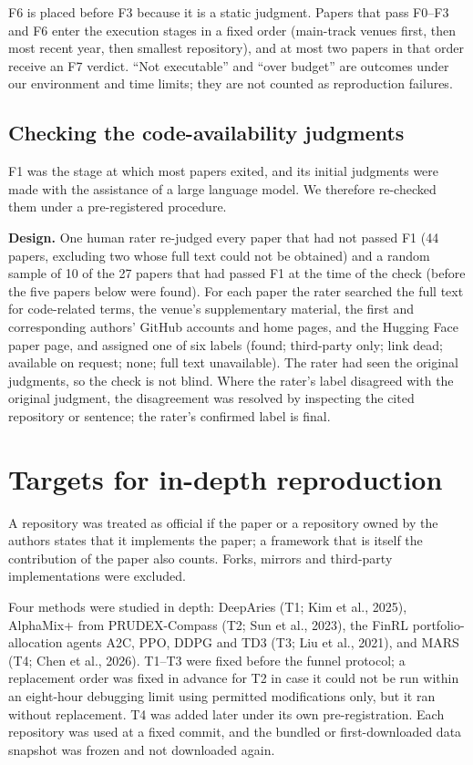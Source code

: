 \documentclass[12pt,a4paper]{report}
\newcounter{none} %
\begin{document}
F6 is placed before F3 because it is a static judgment. Papers that pass
F0--F3 and F6 enter the execution stages in a fixed order (main-track
venues first, then most recent year, then smallest repository), and at
most two papers in that order receive an F7 verdict. ``Not executable''
and ``over budget'' are outcomes under our environment and time limits;
they are not counted as reproduction failures.

\subsection{Checking the code-availability
judgments}\label{checking-the-code-availability-judgments}

F1 was the stage at which most papers exited, and its initial judgments
were made with the assistance of a large language model. We therefore
re-checked them under a pre-registered procedure.

\textbf{Design.} One human rater re-judged every paper that had not
passed F1 (44 papers, excluding two whose full text could not be
obtained) and a random sample of 10 of the 27 papers that had passed F1
at the time of the check (before the five papers below were found). For
each paper the rater searched the full text for code-related terms, the
venue's supplementary material, the first and corresponding authors'
GitHub accounts and home pages, and the Hugging Face paper page, and
assigned one of six labels (found; third-party only; link dead;
available on request; none; full text unavailable). The rater had seen
the original judgments, so the check is not blind. Where the rater's
label disagreed with the original judgment, the disagreement was
resolved by inspecting the cited repository or sentence; the rater's
confirmed label is final.

\section{Targets for in-depth
reproduction}\label{targets-for-in-depth-reproduction}

A repository was treated as official if the paper or a repository owned
by the authors states that it implements the paper; a framework that is
itself the contribution of the paper also counts. Forks, mirrors and
third-party implementations were excluded.

Four methods were studied in depth: DeepAries (T1; Kim et al., 2025),
AlphaMix+ from PRUDEX-Compass (T2; Sun et al., 2023), the FinRL
portfolio-allocation agents A2C, PPO, DDPG and TD3 (T3; Liu et al.,
2021), and MARS (T4; Chen et al., 2026). T1--T3 were fixed before the
funnel protocol; a replacement order was fixed in advance for T2 in case
it could not be run within an eight-hour debugging limit using permitted
modifications only, but it ran without replacement. T4 was added later
under its own pre-registration. Each repository was used at a fixed
commit, and the bundled or first-downloaded data snapshot was frozen and
not downloaded again.
\end{document}
